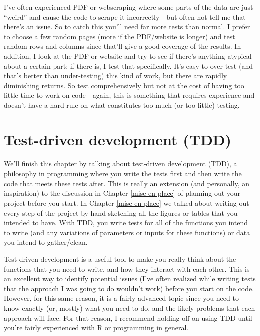 \documentclass[
]{krantz}
\begin{document}
I've often experienced PDF or webscraping where some parts of the data are just ``weird'' and cause the code to scrape it incorrectly - but often not tell me that there's an issue. So to catch this you'll need far more tests than normal. I prefer to choose a few random pages (more if the PDF/website is longer) and test random rows and columns since that'll give a good coverage of the results. In addition, I look at the PDF or website and try to see if there's anything atypical about a certain part; if there is, I test that specifically. It's easy to over-test (and that's better than under-testing) this kind of work, but there are rapidly diminishing returns. So test comprehensively but not at the cost of having too little time to work on code - again, this is something that requires experience and doesn't have a hard rule on what constitutes too much (or too little) testing.

\hypertarget{test-driven-development-tdd}{%
\section{Test-driven development (TDD)}\label{test-driven-development-tdd}}

We'll finish this chapter by talking about test-driven development (TDD), a philosophy in programming where you write the tests first and then write the code that meets these tests after. This is really an extension (and personally, an inspiration) to the discussion in Chapter \ref{mise-en-place} of planning out your project before you start. In Chapter \ref{mise-en-place} we talked about writing out every step of the project by hand sketching all the figures or tables that you intended to have. With TDD, you write tests for all of the functions you intend to write (and any variations of parameters or inputs for these functions) or data you intend to gather/clean.

Test-driven development is a useful tool to make you really think about the functions that you need to write, and how they interact with each other. This is an excellent way to identify potential issues (I've often realized while writing tests that the approach I was going to do wouldn't work) before you start on the code. However, for this same reason, it is a fairly advanced topic since you need to know exactly (or, mostly) what you need to do, and the likely problems that each approach will face. For that reason, I recommend holding off on using TDD until you're fairly experienced with R or programming in general.
\end{document}

